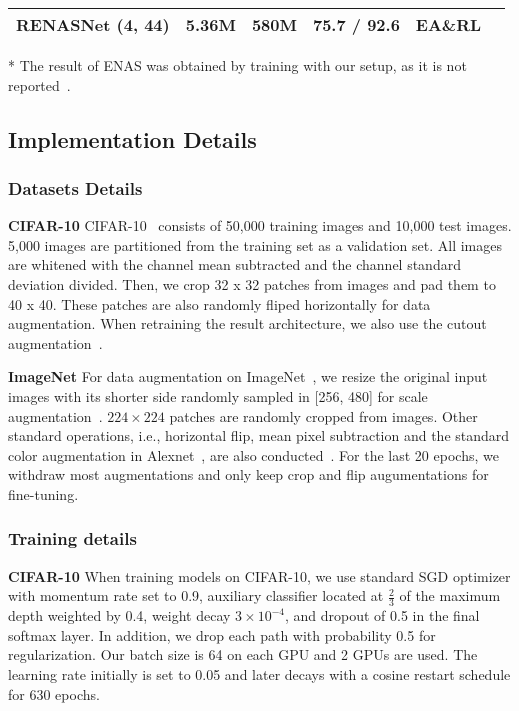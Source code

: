 \documentclass[10pt,twocolumn,letterpaper]{article}
\begin{document}
\begin{table*}[!hbt]
\begin{threeparttable}
\begin{tabular}{ l  c  c  c c c}
      \hline
	RENASNet (4, 44)					 & 5.36M		   &	 580M				& \textbf{75.7} / \textbf{92.6}	   & EA\&RL\\
      \hline
  \end{tabular}

    \begin{tablenotes}
 	\item[*] {\small{The result of ENAS was obtained by training with our setup, as it is not reported~\cite{pham2018efficient}.}}
  \end{tablenotes}
    \end{threeparttable}
    
  \end{table*}
  
\subsection{Implementation Details}
\subsubsection{Datasets Details}%
\noindent
\textbf{CIFAR-10} \quad
CIFAR-10~\cite{Krizhevsky2009Learning} consists of 50,000 training images and 10,000 test images. 5,000 images are partitioned from the training set as a validation set. %
All images are whitened with the channel mean subtracted and the channel standard deviation divided. Then, we crop 32 x 32 patches from images and pad them to 40 x 40. These patches are also randomly fliped horizontally for data augmentation. When retraining the result architecture, we also use the cutout augmentation~\cite{cutout}.

\noindent
\textbf{ImageNet} \quad
For data augmentation on ImageNet~\cite{imagenet}, we resize the original input images with
its shorter side randomly sampled in [256, 480] for scale augmentation~\cite{simonyan2014very}.  $224 \times 224$ patches are randomly cropped from images.
Other standard operations, i.e., horizontal flip, mean pixel subtraction and the standard color augmentation in Alexnet~\cite{krizhevsky2012imagenet}, are also conducted~\cite{krizhevsky2012imagenet}. For the last 20 epochs, we withdraw most augmentations and only keep crop and flip augumentations for fine-tuning.

\subsubsection{Training details}%
\noindent
\textbf{CIFAR-10} \quad
When training models on CIFAR-10, we use standard SGD optimizer with momentum rate set to 0.9, auxiliary classifier located at $\frac{2}{3}$ of the maximum depth weighted by 0.4, weight decay $3\times10^{-4}$, and dropout of 0.5 in the final softmax layer. In addition, we drop each path with probability 0.5 for regularization. Our batch size is 64 on each GPU and 2 GPUs are used. The learning rate initially is set to 0.05 and later decays with a cosine restart schedule for 630 epochs. 
\end{document}

